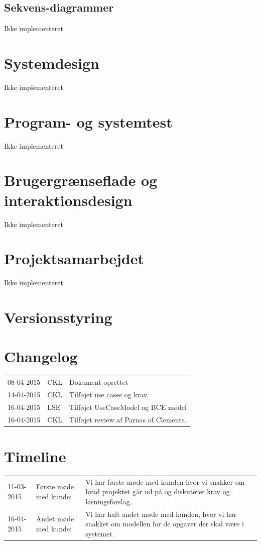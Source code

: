 \documentclass[12pt]{article}
\begin{document}
\subsection{Sekvens-diagrammer}
Ikke implementeret

\section{Systemdesign}
\label{sec:systemdesign}
Ikke implementeret

\section{Program- og systemtest}
\label{sec:program_og_systemtest}
Ikke implementeret

\section{Brugergrænseflade og interaktionsdesign}
\label{sec:brugergraenseflade}
Ikke implementeret

\section{Projektsamarbejdet}
\label{sec:projektsamarbejdet}
Ikke implementeret

\appendix
\section{Versionsstyring}

\section{Changelog}
\begin{tabular}{l l l}
08-04-2015 & CKL & Dokument oprettet \\
14-04-2015 & CKL & Tilføjet use cases og krav \\
16-04-2015 & LSE & Tilføjet UseCaseModel og BCE model \\
16-04-2015 & CKL & Tilføjet review af Parnas of Clements. \\
\end{tabular}

\section{Timeline}
\begin{tabular}{l l p{8cm}}
11-03-2015 & Første møde med kunde: & Vi har første møde med kunden hvor vi snakker om hvad projektet går ud på og diskuterer krav og løsningsforslag. \\
16-04-2015 & Andet møde med kunde: & Vi har haft andet møde med kunden, hvor vi har snakket om modellen for de opgaver der skal være i systemet. \\
\end{tabular}


{}
\end{document}
